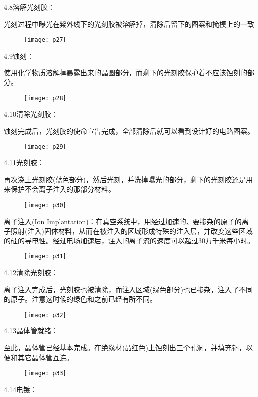 \documentclass[utf8]{book}
\begin{document}
	4.8溶解光刻胶：
	
	光刻过程中曝光在紫外线下的光刻胶被溶解掉，清除后留下的图案和掩模上的一致
		\begin{figure}[H]
		\centering
		\texttt{[image: p27]}
	\end{figure}
	4.9蚀刻：
	
	使用化学物质溶解掉暴露出来的晶圆部分，而剩下的光刻胶保护着不应该蚀刻的部分。
		\begin{figure}[H]
		\centering
		\texttt{[image: p28]}
	\end{figure}
	
	4.10清除光刻胶：
	
	蚀刻完成后，光刻胶的使命宣告完成，全部清除后就可以看到设计好的电路图案。
		\begin{figure}[H]
		\centering
		\texttt{[image: p29]}
	\end{figure}
	4.11光刻胶：
	
	再次浇上光刻胶(蓝色部分)，然后光刻，并洗掉曝光的部分，剩下的光刻胶还是用来保护不会离子注入的那部分材料。
	\begin{figure}[H]
		\centering
		\texttt{[image: p30]}
	\end{figure}
	离子注入(Ion Implantation)：在真空系统中，用经过加速的、要掺杂的原子的离子照射(注入)固体材料，从而在被注入的区域形成特殊的注入层，并改变这些区域的硅的导电性。经过电场加速后，注入的离子流的速度可以超过30万千米每小时。
	\begin{figure}[H]
	\centering
	\texttt{[image: p31]}
\end{figure}
	
	4.12清除光刻胶：
	
	离子注入完成后，光刻胶也被清除，而注入区域(绿色部分)也已掺杂，注入了不同的原子。注意这时候的绿色和之前已经有所不同。
		\begin{figure}[H]
		\centering
		\texttt{[image: p32]}
	\end{figure}
	4.13晶体管就绪：
	
	至此，晶体管已经基本完成。在绝缘材(品红色)上蚀刻出三个孔洞，并填充铜，以便和其它晶体管互连。
	\begin{figure}[H]
		\centering
		\texttt{[image: p33]}
	\end{figure}
	4.14电镀：
	
\end{document}
